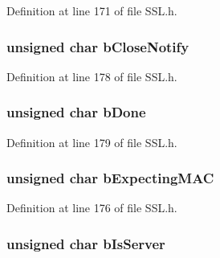 Definition at line 171 of file S\+S\+L.\+h.

\hypertarget{struct_s_s_l___s_t_u_b_a06ead8c4602dac84097eb3412a65aa17}{}
\subsubsection[{b\+Close\+Notify}]{\setlength{\rightskip}{0pt plus 5cm}unsigned char b\+Close\+Notify}\label{struct_s_s_l___s_t_u_b_a06ead8c4602dac84097eb3412a65aa17}


Definition at line 178 of file S\+S\+L.\+h.

\hypertarget{struct_s_s_l___s_t_u_b_a00981d210b98090bf658767a2a0ed4e8}{}
\subsubsection[{b\+Done}]{\setlength{\rightskip}{0pt plus 5cm}unsigned char b\+Done}\label{struct_s_s_l___s_t_u_b_a00981d210b98090bf658767a2a0ed4e8}


Definition at line 179 of file S\+S\+L.\+h.

\hypertarget{struct_s_s_l___s_t_u_b_a6406108a08d7540528d9e99e9e04cc5d}{}
\subsubsection[{b\+Expecting\+M\+A\+C}]{\setlength{\rightskip}{0pt plus 5cm}unsigned char b\+Expecting\+M\+A\+C}\label{struct_s_s_l___s_t_u_b_a6406108a08d7540528d9e99e9e04cc5d}


Definition at line 176 of file S\+S\+L.\+h.

\hypertarget{struct_s_s_l___s_t_u_b_a9696f928e743c579f13f8e33b94e28bb}{}
\subsubsection[{b\+Is\+Server}]{\setlength{\rightskip}{0pt plus 5cm}unsigned char b\+Is\+Server}\label{struct_s_s_l___s_t_u_b_a9696f928e743c579f13f8e33b94e28bb}


